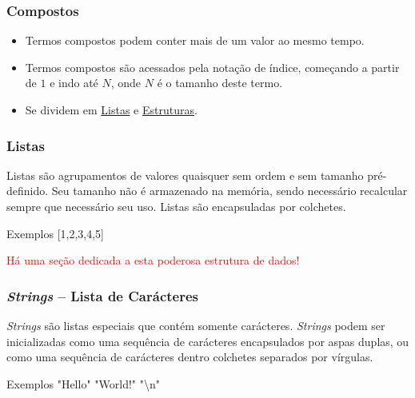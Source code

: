 
\begin{frame}
	\frametitle{Compostos}
	\begin{itemize}
	  \item 	Termos compostos podem conter mais de um valor ao mesmo tempo. 
	  
	  \pause
    \item   Termos compostos são 
	acessados pela notação de índice, começando a partir de $1$ e indo até $N$, onde $N$
	 é o tamanho deste termo.

	  \pause
    \item 	Se dividem em \underline{Listas} e \underline{Estruturas}.
	
    
	\end{itemize}
	
	
	
\end{frame}


\begin{frame}
	\frametitle{Listas}
	
	Listas são agrupamentos de valores quaisquer sem ordem e sem tamanho pré-definido. Seu tamanho não é 
	armazenado na memória, sendo necessário recalcular sempre que necessário seu uso. Listas são 
	encapsuladas por colchetes.
	
	\begin{exampleblock}{Exemplos}
		[1,2,3,4,5] \: [a,b,32,1.5,aaac] \: ["string",14,22]
	\end{exampleblock}

\textcolor{red}{Há uma seção dedicada a esta poderosa  estrutura de dados!}
	
\end{frame}


\begin{frame}
	\frametitle{\textit{Strings} -- Lista de Carácteres}
	
	\textit{Strings} são listas especiais que contém somente carácteres. \textit{Strings} podem ser inicializadas como uma 
	sequência de carácteres encapsulados por aspas duplas, ou como uma sequência de carácteres dentro 
	colchetes separados por vírgulas.
	
	\begin{exampleblock}{Exemplos}
		"Hello" \: "World!" \: "\textbackslash n" \: [o,l,a,"\:",m,u,n,d,o] 
	\end{exampleblock}
	
\end{frame}

